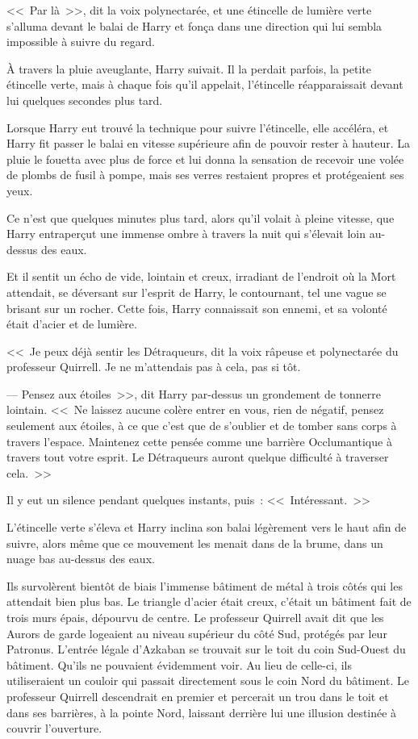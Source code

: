 <<~Par là~>>, dit la voix polynectarée, et une étincelle de lumière verte s'alluma devant le balai de Harry et fonça dans une direction qui lui sembla impossible à suivre du regard.

À travers la pluie aveuglante, Harry suivait. Il la perdait parfois, la petite étincelle verte, mais à chaque fois qu'il appelait, l'étincelle réapparaissait devant lui quelques secondes plus tard.

Lorsque Harry eut trouvé la technique pour suivre l'étincelle, elle accéléra, et Harry fit passer le balai en vitesse supérieure afin de pouvoir rester à hauteur. La pluie le fouetta avec plus de force et lui donna la sensation de recevoir une volée de plombs de fusil à pompe, mais ses verres restaient propres et protégeaient ses yeux.

Ce n'est que quelques minutes plus tard, alors qu'il volait à pleine vitesse, que Harry entraperçut une immense ombre à travers la nuit qui s'élevait loin au-dessus des eaux.

Et il sentit un écho de vide, lointain et creux, irradiant de l'endroit où la Mort attendait, se déversant sur l'esprit de Harry, le contournant, tel une vague se brisant sur un rocher. Cette fois, Harry connaissait son ennemi, et sa volonté était d'acier et de lumière.

<<~Je peux déjà sentir les Détraqueurs, dit la voix râpeuse et polynectarée du professeur Quirrell. Je ne m'attendais pas à cela, pas si tôt.

--- Pensez aux étoiles~>>, dit Harry par-dessus un grondement de tonnerre lointain. <<~Ne laissez aucune colère entrer en vous, rien de négatif, pensez seulement aux étoiles, à ce que c'est que de s'oublier et de tomber sans corps à travers l'espace. Maintenez cette pensée comme une barrière Occlumantique à travers tout votre esprit. Le Détraqueurs auront quelque difficulté à traverser cela.~>>

Il y eut un silence pendant quelques instants, puis~: <<~Intéressant.~>>

L'étincelle verte s'éleva et Harry inclina son balai légèrement vers le haut afin de suivre, alors même que ce mouvement les menait dans de la brume, dans un nuage bas au-dessus des eaux.

Ils survolèrent bientôt de biais l'immense bâtiment de métal à trois côtés qui les attendait bien plus bas. Le triangle d'acier était creux, c'était un bâtiment fait de trois murs épais, dépourvu de centre. Le professeur Quirrell avait dit que les Aurors de garde logeaient au niveau supérieur du côté Sud, protégés par leur Patronus. L'entrée légale d'Azkaban se trouvait sur le toit du coin Sud-Ouest du bâtiment. Qu'ils ne pouvaient évidemment voir. Au lieu de celle-ci, ils utiliseraient un couloir qui passait directement sous le coin Nord du bâtiment. Le professeur Quirrell descendrait en premier et percerait un trou dans le toit et dans ses barrières, à la pointe Nord, laissant derrière lui une illusion destinée à couvrir l'ouverture.

